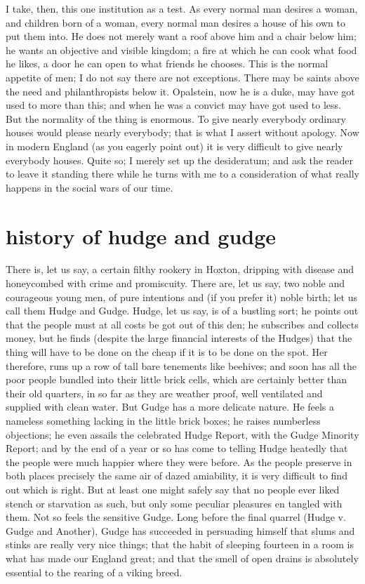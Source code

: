 \documentclass[final,10pt,letterpaper,twocolumn,openany]{book}
\begin{document}
I take, then, this one institution as a test. As every normal man desires
a woman, and children born of a woman, every normal man desires a
house of his own to put them into. He does not merely want a roof above
him and a chair below him; he wants an objective and visible kingdom; a
fire at which he can cook what food he likes, a door he can open to what
friends he chooses. This is the normal appetite of men; I do not say there
are not exceptions. There may be saints above the need and philanthropists
below it. Opalstein, now he is a duke, may have got used to more than this;
and when he was a convict may have got used to less. But the normality of
the thing is enormous. To give nearly everybody ordinary houses would
please nearly everybody; that is what I assert without apology. Now in
modern England (as you eagerly point out) it is very difficult to give
nearly everybody houses. Quite so; I merely set up the desideratum; and
ask the reader to leave it standing there while he turns with me to a
consideration of what really happens in the social wars of our time.

\section{history of hudge and gudge}

     There is, let us say, a certain filthy rookery in Hoxton, dripping with
disease and honeycombed with crime and promiscuity. There are, let us
say, two noble and courageous young men, of pure intentions and (if you
prefer it) noble birth; let us call them Hudge and Gudge. Hudge, let us say,
is of a bustling sort; he points out that the people must at all costs be got
out of this den; he subscribes and collects money, but he finds (despite the
large financial interests of the Hudges) that the thing will have to be done
on the cheap if it is to be done on the spot. Her therefore, runs up a row of
tall bare tenements like beehives; and soon has all the poor people bundled
into their little brick cells, which are certainly better than their old quarters,
in so far as they are weather proof, well ventilated and supplied with clean
water. But Gudge has a more delicate nature. He feels a nameless
something lacking in the little brick boxes; he raises numberless objections;
he even assails the celebrated Hudge Report, with the Gudge Minority
Report; and by the end of a year or so has come to telling Hudge heatedly
that the people were much happier where they were before. As the people
preserve in both places precisely the same air of dazed amiability, it is
very difficult to find out which is right. But at least one might safely say
that no people ever liked stench or starvation as such, but only some
peculiar pleasures en tangled with them. Not so feels the sensitive Gudge.
Long before the final quarrel (Hudge v. Gudge and Another), Gudge has
succeeded in persuading himself that slums and stinks are really very nice
things; that the habit of sleeping fourteen in a room is what has made our
England great; and that the smell of open drains is absolutely essential to
the rearing of a viking breed.
\end{document}

